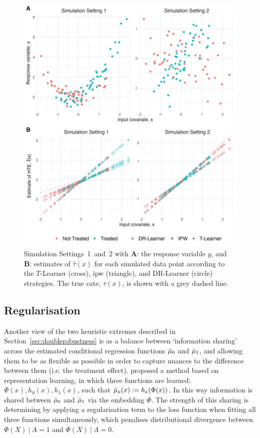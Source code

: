 \documentclass[../thesis.tex]{subfiles}
\begin{document}
\begin{figure}[!tpb] 
\centering
\includegraphics[width=\textwidth]{figures/chapter4/comp_figure_with_dr.png}
\caption{Simulation Settings~1~and~2 with \textbf{A}: the response variable $y$, and \textbf{B}: estimates of $\hat{\tau}(x)$ for each simulated data point according to the $T$-Learner (cross), \gls{ipw} (triangle), and DR-Learner (circle) strategies. The true \gls{cate}, $\tau(x)$, is shown with a grey dashed line.  \label{fig:comp_t_ipw_dr}}
\end{figure}

\subsection{Regularisation}
Another view of the two heuristic extremes described in Section~\ref{sec:doublerobustness} is as a balance between  `information sharing' across the estimated conditional regression functions $\hat{\mu}_0$ and $\hat{\mu}_1$, and allowing them to be as flexible as possible in order to capture nuances to the difference between them (i.e. the treatment effect). \citet{shalit_estimating_2017} proposed a method based on representation learning, in which three functions are learned: $\Phi(x), h_0(x), h_1(x)$, such that $\hat{\mu}_a(x) := h_a(\Phi(x))$. In this way information is shared between $\hat{\mu}_0$ and $\hat{\mu}_1$ via the embedding $\Phi$. The strength of this sharing is determining by applying a regularisation term to the loss function when fitting all three functions simultaneously, which penalises distributional divergence between $\Phi(X) \ | \ A = 1$ and $\Phi(X)  \ | \ A = 0$. 
\end{document}
